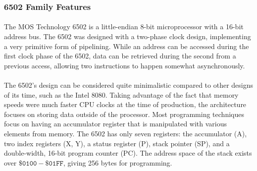 \documentclass{article}
\begin{document}
\subsubsection{6502 Family Features}

\paragraph{}
The MOS Technology 6502 is a little-endian 8-bit microprocessor with a 16-bit address bus. The 6502 was designed with a two-phase clock design, implementing a very primitive form of pipelining. While an address can be accessed during the first clock phase of the 6502, data can be retrieved during the second from a previous access, allowing two instructions to happen somewhat asynchronously. 

\paragraph{}
The 6502's design can be considered quite minimalistic compared to other designs of its time, such as the Intel 8080. Taking advantage of the fact that memory speeds were much faster CPU clocks at the time of production, the architecture focuses on storing data outside of the processor. Most programming techniques focus on having an accumulator register that is manipulated with various elements from memory. The 6502 has only seven registers: the accumulator (A), two index registers (X, Y), a status register (P), stack pointer (SP), and a double-width, 16-bit program counter (PC). The address space of the stack exists over $\mathtt{\$0100 - \$01FF}$, giving 256 bytes for programming. 
\end{document}
